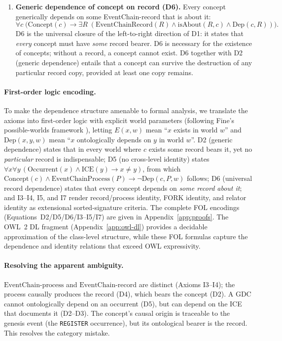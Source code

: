 \begin{enumerate}[label=Axiom D\arabic*:,leftmargin=3em]
    \item \textbf{Generic dependence of concept on record (D6).} Every concept generically depends on some EventChain-record that is about it:
    \begin{equation}\label{eq:d6}
        \forall c\;\bigl(\text{Concept}(c) \rightarrow \exists R\;(\text{EventChainRecord}(R) \land \text{isAbout}(R, c) \land \text{Dep}(c, R))\bigr).
    \end{equation}
    D6 is the universal closure of the left-to-right direction of D1: it states that \emph{every} concept must have \emph{some} record bearer. D6 is necessary for the existence of concepts; without a record, a concept cannot exist. D6 together with D2 (generic dependence) entails that a concept can survive the destruction of any particular record copy, provided at least one copy remains.
\end{enumerate}

\paragraph{First-order logic encoding.} To make the dependence structure amenable to formal analysis, we translate the axioms into first-order logic with explicit world parameters (following Fine's possible-worlds framework \cite{fine1995ontologicaldependence}), letting $E(x,w)$ mean ``$x$ exists in world $w$'' and $\text{Dep}(x,y,w)$ mean ``$x$ ontologically depends on $y$ in world $w$''. D2 (generic dependence) states that in every world where $c$ exists some record bears it, yet no \emph{particular} record is indispensable; D5 (no cross-level identity) states $\forall x \forall y\,(\text{Occurrent}(x) \land \text{ICE}(y) \rightarrow x \neq y)$, from which $\text{Concept}(c) \land \text{EventChainProcess}(P) \rightarrow \neg\text{Dep}(c,P,w)$ follows; D6 (universal record dependence) states that every concept depends on \emph{some record about it}; and I3--I4, I5, and I7 render record/process identity, FORK identity, and relator identity as extensional sorted-signature criteria. The complete FOL encodings (Equations~D2/D5/D6/I3--I5/I7) are given in Appendix~\ref{app:proofs}. The OWL~2 DL fragment (Appendix~\ref{app:owl-dl}) provides a decidable approximation of the class-level structure, while these FOL formulas capture the dependence and identity relations that exceed OWL expressivity.

\paragraph{Resolving the apparent ambiguity.}
$\text{EventChain-process}$ and $\text{EventChain-record}$ are distinct (Axioms I3--I4); the process causally produces the record (D4), which bears the concept (D2). A GDC cannot ontologically depend on an occurrent (D5), but can depend on the ICE that documents it (D2--D3). The concept's causal origin is traceable to the genesis event (the \texttt{REGISTER} occurrence), but its ontological bearer is the record. This resolves the category mistake.
